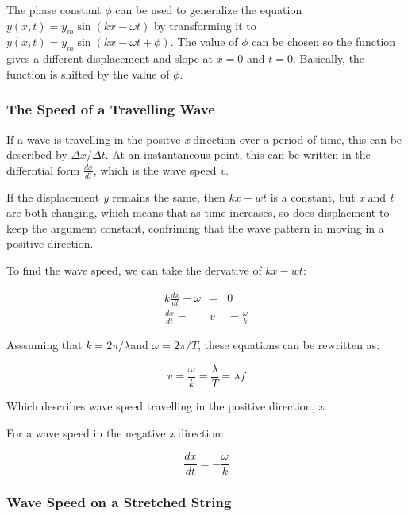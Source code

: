 \documentclass[english]{article}
\begin{document}
The phase constant $\phi$ can be used to generalize the equation
$y(x,t)=y_{m}\sin(kx-\omega t)$ by transforming it to $y(x,t)=y_{m}\sin(kx-\omega t+\phi)$.
The value of $\phi$ can be chosen so the function gives a different
displacement and slope at $x=0$ and $t=0$. Basically, the function
is shifted by the value of $\phi$.


\subsubsection*{The Speed of a Travelling Wave}

If a wave is travelling in the positve \emph{x }direction over a period
of time, this can be described by $\Delta x/\Delta t$. At an instantaneous
point, this can be written in the differntial form $\frac{dx}{dt}$,
which is the wave speed\emph{ v.}

If the displacement \emph{y }remains the same, then $kx-wt$ is a
constant, but \emph{x }and \emph{t }are both changing, which means
that as time increases, so does displacment to keep the argument constant,
confriming that the wave pattern in moving in a positive direction.

To find the wave speed, we can take the dervative of $kx-wt$:

\begin{eqnarray*}
k\frac{dx}{dt}-\omega & = & 0\\
\frac{dx}{dt}= & v & =\frac{\omega}{k}
\end{eqnarray*}


Asssuming that $k=2\pi/\lambda$and $\omega=2\pi/T$, these equations
can be rewritten as:

\[
v=\frac{\omega}{k}=\frac{\lambda}{T}=\lambda f
\]


Which describes wave speed travelling in the positive direction, \emph{x.}

For a wave speed in the negative \emph{x }direction:

\[
\frac{dx}{dt}=-\frac{\omega}{k}
\]



\subsubsection*{Wave Speed on a Stretched String}
\end{document}
